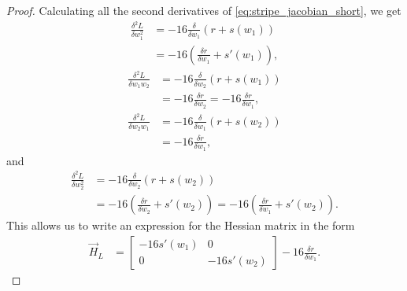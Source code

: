 \begin{proof}
    Calculating all the second derivatives of \ref{eq:stripe_jacobian_short}, we get
    \begin{align*}
        \frac{\delta^2 L}{\delta w_1^2}
        &= -16 \frac{\delta}{\delta w_1} \left( r + s(w_1) \right) \\
        &= -16 \left( \frac{\delta r}{\delta w_1} + s'(w_1) \right),
    \end{align*}
    \begin{align*}
        \frac{\delta^2 L}{\delta w_1 w_2}
        &= -16 \frac{\delta}{\delta w_2} \left( r + s(w_1) \right) \\
        &= -16 \frac{\delta r}{\delta w_2}
         = -16 \frac{\delta r}{\delta w_1},
    \end{align*}
    \begin{align*}
        \frac{\delta^2 L}{\delta w_2 w_1}
        &= -16 \frac{\delta}{\delta w_1} \left( r + s(w_2) \right) \\
        &= -16 \frac{\delta r}{\delta w_1},
    \end{align*}
    and
    \begin{align*}
        \frac{\delta^2 L}{\delta w_2^2}
        &= -16 \frac{\delta}{\delta w_2} \left( r + s(w_2) \right) \\
        &= -16 \left( \frac{\delta r}{\delta w_2} + s'(w_2) \right)
         = -16 \left( \frac{\delta r}{\delta w_1} + s'(w_2) \right).
    \end{align*}
    This allows us to write an expression for the Hessian matrix in the form
    \begin{align}
        \label{eq:stripe_hessian}
        \vec{H}_L
        &=
            \begin{bmatrix}
                -16 s'(w_1) & 0 \\
                0 & -16 s'(w_2)
            \end{bmatrix}
            -16 \frac{\delta r}{\delta w_1}.
    \end{align}


\end{proof}
